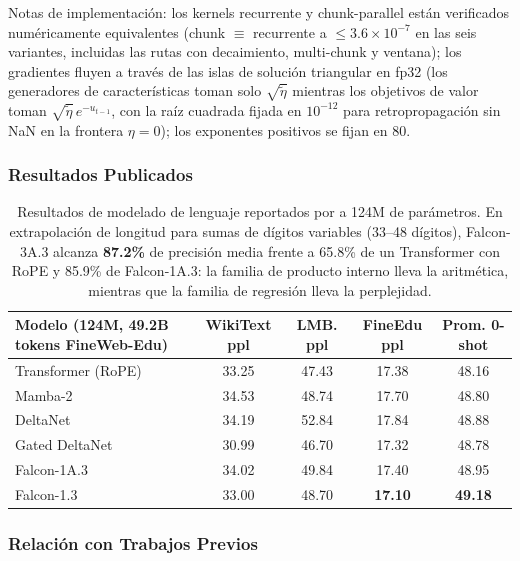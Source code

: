 Notas de implementación: los kernels recurrente y chunk-parallel están verificados numéricamente equivalentes (chunk $\equiv$ recurrente a $\le 3.6 \times 10^{-7}$ en las seis variantes, incluidas las rutas con decaimiento, multi-chunk y ventana); los gradientes fluyen a través de las islas de solución triangular en fp32 (los generadores de características toman solo $\sqrt{\tilde{\eta}}$ mientras los objetivos de valor toman $\sqrt{\tilde{\eta}}\, e^{-u_{t-1}}$, con la raíz cuadrada fijada en $10^{-12}$ para retropropagación sin NaN en la frontera $\eta = 0$); los exponentes positivos se fijan en $80$.

\subsubsection{Resultados Publicados}

\begin{table}[H]
\centering
\small
\begin{tabularx}{0.95\linewidth}{Xcccc}
\toprule
\textbf{Modelo (124M, 49.2B tokens FineWeb-Edu)} & \textbf{WikiText ppl} & \textbf{LMB. ppl} & \textbf{FineEdu ppl} & \textbf{Prom. 0-shot} \\
\midrule
Transformer (RoPE) & 33.25 & 47.43 & 17.38 & 48.16 \\
Mamba-2 & 34.53 & 48.74 & 17.70 & 48.80 \\
DeltaNet & 34.19 & 52.84 & 17.84 & 48.88 \\
Gated DeltaNet & 30.99 & 46.70 & 17.32 & 48.78 \\
Falcon-1A.3 & 34.02 & 49.84 & 17.40 & 48.95 \\
Falcon-1.3 & 33.00 & 48.70 & \textbf{17.10} & \textbf{49.18} \\
\bottomrule
\end{tabularx}
\caption{Resultados de modelado de lenguaje reportados por \citet{zhang_falcon_2026} a 124M de parámetros. En extrapolación de longitud para sumas de dígitos variables (33--48 dígitos), Falcon-3A.3 alcanza \textbf{87.2\%} de precisión media frente a 65.8\% de un Transformer con RoPE y 85.9\% de Falcon-1A.3: la familia de producto interno lleva la aritmética, mientras que la familia de regresión lleva la perplejidad.}
\label{tab:falcon-results}
\end{table}

\subsubsection{Relación con Trabajos Previos}


